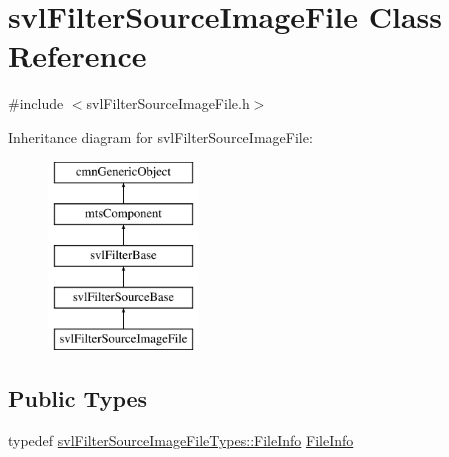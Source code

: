 \hypertarget{classsvl_filter_source_image_file}{}\section{svl\+Filter\+Source\+Image\+File Class Reference}
\label{classsvl_filter_source_image_file}


{\ttfamily \#include $<$svl\+Filter\+Source\+Image\+File.\+h$>$}

Inheritance diagram for svl\+Filter\+Source\+Image\+File\+:\begin{figure}[H]
\begin{center}
\leavevmode
\includegraphics[height=5.000000cm]{d3/dcc/classsvl_filter_source_image_file}
\end{center}
\end{figure}
\subsection*{Public Types}
\begin{DoxyCompactItemize}
\item 
typedef \hyperlink{classsvl_filter_source_image_file_types_1_1_file_info}{svl\+Filter\+Source\+Image\+File\+Types\+::\+File\+Info} \hyperlink{classsvl_filter_source_image_file_a0acade731f76b2a1adc5a6a43417c4f4}{File\+Info}
\end{DoxyCompactItemize}
